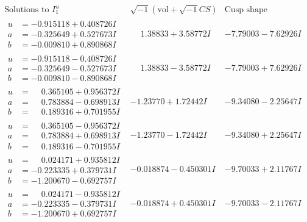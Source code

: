 \documentclass[1p]{elsarticle_modified}
\theoremstyle{definition}
\newcommand{\I}{\sqrt{-1}}
\begin{document}
$$\begin{array}{c|c|c}  
\text{Solutions to }I^u_{1}& \I (\text{vol} + \sqrt{-1}CS) & \text{Cusp shape}\\
 \hline 
\begin{aligned}
u &= -0.915118 + 0.408726 I \\
a &= -0.325649 + 0.527673 I \\
b &= -0.009810 + 0.890868 I\end{aligned}
 & \phantom{-}1.38833 + 3.58772 I & -7.79003 - 7.62926 I \\ \hline\begin{aligned}
u &= -0.915118 - 0.408726 I \\
a &= -0.325649 - 0.527673 I \\
b &= -0.009810 - 0.890868 I\end{aligned}
 & \phantom{-}1.38833 - 3.58772 I & -7.79003 + 7.62926 I \\ \hline\begin{aligned}
u &= \phantom{-}0.365105 + 0.956372 I \\
a &= \phantom{-}0.783884 - 0.698913 I \\
b &= \phantom{-}0.189316 + 0.701955 I\end{aligned}
 & -1.23770 + 1.72442 I & -9.34080 - 2.25647 I \\ \hline\begin{aligned}
u &= \phantom{-}0.365105 - 0.956372 I \\
a &= \phantom{-}0.783884 + 0.698913 I \\
b &= \phantom{-}0.189316 - 0.701955 I\end{aligned}
 & -1.23770 - 1.72442 I & -9.34080 + 2.25647 I \\ \hline\begin{aligned}
u &= \phantom{-}0.024171 + 0.935812 I \\
a &= -0.223335 + 0.379731 I \\
b &= -1.200670 - 0.692757 I\end{aligned}
 & -0.018874 - 0.450301 I & -9.70033 + 2.11767 I \\ \hline\begin{aligned}
u &= \phantom{-}0.024171 - 0.935812 I \\
a &= -0.223335 - 0.379731 I \\
b &= -1.200670 + 0.692757 I\end{aligned}
 & -0.018874 + 0.450301 I & -9.70033 - 2.11767 I \\ \hline\begin{aligned}

\end{aligned}
\end{array}$$
\end{document}
